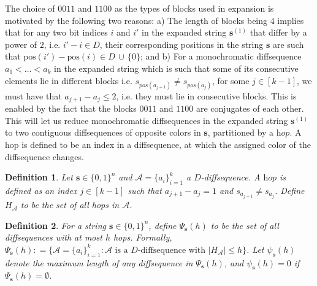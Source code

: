 \documentclass[11pt]{article}
\newtheorem{ex}{Example}
\newtheorem{definition}{Definition}
\begin{document}

The choice of $0011$ and $1100$ as the types of blocks used in expansion is motivated by the following two reasons: a) The length of blocks being $4$ implies that for any two bit indices $i$ and $i'$ in the expanded string $\mathbf{s}^{(1)}$ that differ by a power of $2$, i.e. $i'-i \in D$, their corresponding positions in the string $\mathbf{s}$ are such that $\mathrm{pos}(i') - \mathrm{pos}(i) \in D \, \cup \, \{0\}$; and b) For a monochromatic diffsequence $a_1< \ldots < a_k$ in the expanded string which is such that some of its consecutive elements lie in different blocks i.e. $s_{pos(a_{j+1})} \neq s_{pos(a_{j})}$, for some $j \in [k-1]$, we must have that $a_{j+1} - a_{j} \le 2$, i.e. they must lie in consecutive blocks. This is enabled by the fact that the blocks $0011$ and $1100$ are conjugates of each other. This will let us reduce monochromatic diffsequences in the expanded string $\mathbf{s}^{(1)}$ to two contiguous diffsequences of opposite colors in $\mathbf{s}$, partitioned by a $\textit{hop}$. A hop is defined to be an index in a diffsequence, at which the assigned color of the diffsequence changes.

\begin{definition}\label{def: hops}
Let $\mathbf{s} \in \{ 0,1 \}^n$ and $\mathcal{A}=\{a_i\}_{i=1}^k$ a $D$-diffsequence. A $\textit{hop}$ is defined as an index $j \in [k-1]$ such that $a_{j+1}-a_j=1$ and $s_{a_{j+1}}\neq s_{a_{j}}$. Define $H_{\mathcal{A}}$ to be the set of all hops in $\mathcal{A}$.
\end{definition}

\begin{definition}\label{def: Psi_psi}
For a string $\mathbf{s} \in \{ 0,1 \}^n$, define $\Psi_{\mathbf{s}}(h)$ to be the set of all diffsequences with at most $h$ hops. Formally, $ \Psi_{\mathbf{s}}(h): =\{\mathcal{A}=\{a_i\}_{i=1}^k 
    :\mathcal{A} \text{ is a } D\text{-diffsequence with } |H_{\mathcal{A}}|\le h\}$. Let $\psi_\mathbf{s}(h)$ denote the maximum length of any diffsequence in $\Psi_{\mathbf{s}}(h)$, and $\psi_\mathbf{s}(h) = 0$ if $\Psi_{\mathbf{s}}(h) = \emptyset$.
\end{definition}
\end{document}
